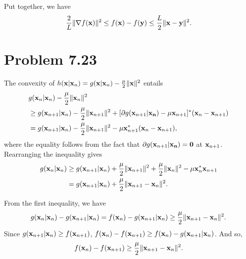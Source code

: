 \documentclass{scrartcl}
\begin{document}
Put together, we have 
\begin{equation}
{2 \over L}\|\nabla f(\mathbf{x})\|^2 \le f(\mathbf{x})-f(\mathbf{y}) \le {L \over 2}\|\mathbf{x}-\mathbf{y}\|^2 .
\end{equation}


\section*{Problem 7.23}

The convexity of $h(\mathbf{x} | \mathbf{x}_n) = g(\mathbf{x} | \mathbf{x}_n) - {\mu \over 2} \|\mathbf{x}\|^2$ entails
\begin{equation}
\begin{split}
& g(\mathbf{x}_n | \mathbf{x}_n) - {\mu \over 2}\|\mathbf{x}_n\|^2 \\
& \ge g(\mathbf{x}_{n+1}|\mathbf{x}_n) - {\mu \over 2}\|\mathbf{x}_{n+1}\|^2 + [\partial g(\mathbf{x}_{n+1}|\mathbf{x_n})-\mu\mathbf{x}_{n+1}]^*(\mathbf{x}_{n}-\mathbf{x}_{n+1}) \\
& = g(\mathbf{x}_{n+1}|\mathbf{x}_n) - {\mu \over 2}\|\mathbf{x}_{n+1}\|^2 -\mu\mathbf{x}_{n+1}^*(\mathbf{x}_{n}-\mathbf{x}_{n+1}),
\end{split}
\end{equation}
where the equality follows from the fact that $\partial g(\mathbf{x}_{n+1}|\mathbf{x_n}) = \mathbf{0}$ at $\mathbf{x}_{n+1}$. Rearranging the inequality gives
\begin{equation}
\begin{split}
g(\mathbf{x}_n | \mathbf{x}_n) & \ge g(\mathbf{x}_{n+1}|\mathbf{x}_n) + {\mu \over 2} \|\mathbf{x}_{n+1}\|^2 + {\mu \over 2} \|\mathbf{x}_{n}\|^2 - \mu \mathbf{x}_n^*\mathbf{x}_{n+1} \\
& = g(\mathbf{x}_{n+1}|\mathbf{x}_n) + {\mu \over 2} \|\mathbf{x}_{n+1}-\mathbf{x}_n\|^2.
\end{split}
\end{equation}

From the first inequality, we have
\begin{equation}
g(\mathbf{x}_n | \mathbf{x}_n) - g(\mathbf{x}_{n+1}|\mathbf{x}_n) = f(\mathbf{x}_n) - g(\mathbf{x}_{n+1}|\mathbf{x}_n) \ge {\mu \over 2} \|\mathbf{x}_{n+1}-\mathbf{x}_n\|^2.
\end{equation}
Since $g(\mathbf{x}_{n+1}|\mathbf{x}_n) \ge f(\mathbf{x}_{n+1})$, $f(\mathbf{x}_n) -f(\mathbf{x}_{n+1}) \ge f(\mathbf{x}_n) - g(\mathbf{x}_{n+1}|\mathbf{x}_n)$.
And so, 
\begin{equation}
f(\mathbf{x}_n) -f(\mathbf{x}_{n+1}) \ge {\mu \over 2} \|\mathbf{x}_{n+1}-\mathbf{x}_n\|^2 .
\end{equation}
\end{document}
